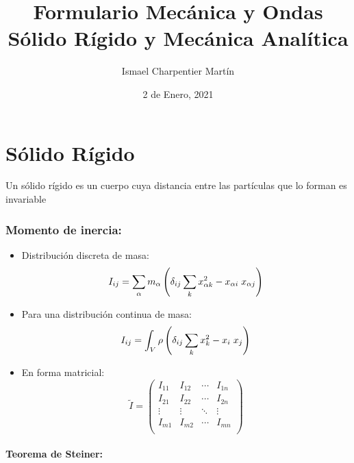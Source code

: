 \documentclass[14pt]{extarticle}
\title{
	\Huge{Formulario Mecánica y Ondas} \\
	\medskip
	\large Sólido Rígido y Mecánica Analítica}
\author{Ismael Charpentier Martín}
\date{2 de Enero, 2021}
\begin{document}
\maketitle
\clearpage

\tableofcontents
\clearpage

\part{Sólido Rígido}

	Un sólido rígido es un cuerpo cuya distancia entre las partículas que lo forman es invariable

	\section{Momento de inercia:}

		\begin{itemize}

			\item{
			Distribución discreta de masa:
			\begin{equation}
				I_{ij} = \sum_\alpha m_\alpha \left( \delta_{ij} \sum_k x^2_{\alpha k} - x_{\alpha i}\hspace*{1mm} x_{\alpha j} \right)
			\end{equation}
			}

			\item{
			Para una distribución continua de masa:
			\begin{equation}
				I_{ij} = \int_V \rho \left( \delta_{ij} \sum_k x^2_{k} - x_{i}\hspace*{1mm} x_{j} \right)
			\end{equation}
			}

			\item{
			En forma matricial:
			\begin{equation}
				\tilde{I} = 
				\begin{pmatrix}
					I_{11} & I_{12} & \cdots & I_{1n}\\
					I_{21} & I_{22} & \cdots & I_{2n}\\
					\vdots & \vdots & \ddots & \vdots \\
					I_{m1} & I_{m2} & \cdots & I_{mn}\\
				\end{pmatrix}
			\end{equation}
			}
		\end{itemize}

		\subsection{Teorema de Steiner:}
\end{document}

